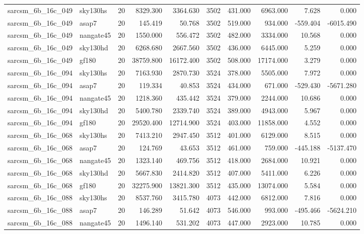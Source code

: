 \documentclass{article}
\begin{document}
\begin{longtable}{llrrrrrrrr}
sarcsm\_6b\_16c\_049 & sky130hs & 20 & 8329.300 & 3364.630 & 3502 & 431.000 & 6963.000 & 7.628 & 0.000 \\
sarcsm\_6b\_16c\_049 & asap7 & 20 & 145.419 & 50.768 & 3502 & 519.000 & 934.000 & -559.404 & -6015.490 \\
sarcsm\_6b\_16c\_049 & nangate45 & 20 & 1550.000 & 556.472 & 3502 & 482.000 & 3334.000 & 10.568 & 0.000 \\
sarcsm\_6b\_16c\_049 & sky130hd & 20 & 6268.680 & 2667.560 & 3502 & 436.000 & 6445.000 & 5.259 & 0.000 \\
sarcsm\_6b\_16c\_049 & gf180 & 20 & 38759.800 & 16172.400 & 3502 & 508.000 & 17174.000 & 3.279 & 0.000 \\
sarcsm\_6b\_16c\_094 & sky130hs & 20 & 7163.930 & 2870.730 & 3524 & 378.000 & 5505.000 & 7.972 & 0.000 \\
sarcsm\_6b\_16c\_094 & asap7 & 20 & 119.334 & 40.853 & 3524 & 434.000 & 671.000 & -529.430 & -5671.280 \\
sarcsm\_6b\_16c\_094 & nangate45 & 20 & 1218.360 & 435.442 & 3524 & 379.000 & 2244.000 & 10.686 & 0.000 \\
sarcsm\_6b\_16c\_094 & sky130hd & 20 & 5400.780 & 2339.740 & 3524 & 389.000 & 4943.000 & 5.967 & 0.000 \\
sarcsm\_6b\_16c\_094 & gf180 & 20 & 29520.400 & 12714.900 & 3524 & 403.000 & 11858.000 & 4.552 & 0.000 \\
sarcsm\_6b\_16c\_068 & sky130hs & 20 & 7413.210 & 2947.450 & 3512 & 401.000 & 6129.000 & 8.515 & 0.000 \\
sarcsm\_6b\_16c\_068 & asap7 & 20 & 124.769 & 43.653 & 3512 & 461.000 & 759.000 & -445.188 & -5137.470 \\
sarcsm\_6b\_16c\_068 & nangate45 & 20 & 1323.140 & 469.756 & 3512 & 418.000 & 2684.000 & 10.921 & 0.000 \\
sarcsm\_6b\_16c\_068 & sky130hd & 20 & 5667.830 & 2414.820 & 3512 & 407.000 & 5411.000 & 6.226 & 0.000 \\
sarcsm\_6b\_16c\_068 & gf180 & 20 & 32275.900 & 13821.300 & 3512 & 435.000 & 13074.000 & 5.584 & 0.000 \\
sarcsm\_6b\_16c\_088 & sky130hs & 20 & 8537.760 & 3415.780 & 4073 & 442.000 & 6812.000 & 7.816 & 0.000 \\
sarcsm\_6b\_16c\_088 & asap7 & 20 & 146.289 & 51.642 & 4073 & 546.000 & 993.000 & -495.466 & -5624.210 \\
sarcsm\_6b\_16c\_088 & nangate45 & 20 & 1496.140 & 531.202 & 4073 & 447.000 & 2923.000 & 10.785 & 0.000 \\

\end{longtable}
\end{document}
